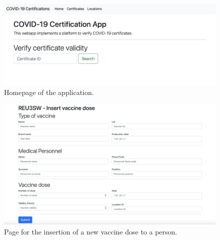 \documentclass{article}
\begin{document}
\begin{figure}[ht!]
    \centering
    \includegraphics[scale=0.3]{screenshots/homepage.png}
    \caption{Homepage of the application.}
\end{figure}
\begin{figure}[ht!]
    \centering
    \includegraphics[scale=0.3]{screenshots/insertvaccine.png}
    \caption{Page for the insertion of a new vaccine dose to a person.}
\end{figure}
\end{document}
